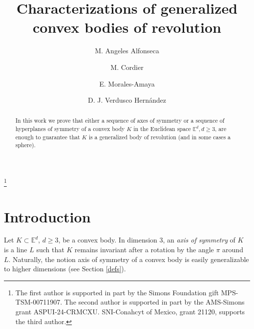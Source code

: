\documentclass[12pt,thmsa]{amsart}
\title[Generalized bodies of revolution]{Characterizations of generalized convex bodies of revolution}
\newcommand{\Ed}{\mathbb{E}^{d}}
\begin{document}
 \author[Alfonseca]{
M. Angeles Alfonseca}
\address{North Dakota State University, USA}  

\author[Cordier]{M. Cordier}    
\address{Chatham University, USA}

\author[Morales]{E. Morales-Amaya}
\address{Facultad de Matem\'aticas-Acapulco\\
Universidad Aut\'onoma de Guerrero, Mexico}

\author[Verdusco]{D. J. Verdusco Hern\'andez}
\address{Facultad de Matem\'aticas-Acapulco\\
Universidad Aut\'onoma de Guerrero, Mexico}

 \thanks{The first author is supported in part by the Simons Foundation gift MPS-TSM-00711907. The second author is supported in part by the AMS-Simons grant ASPUI-24-CRMCXU. SNI-Conahcyt of Mexico, grant 21120, supports the third author.}


 






\begin{abstract}
In this work we prove that either a sequence of axes of symmetry or a sequence of hyperplanes of symmetry of a convex body $K$ in the Euclidean space $\Ed, d\geq 3$, are enough to guarantee that $K$ is a generalized body of revolution (and in some cases a sphere).
\end{abstract}




\maketitle



\section{Introduction}


Let $K\subset \Ed$, $d\geq 3$, be a convex body. In dimension 3, an \textit{axis of symmetry} of $K$ is a line $L$ such that $K$ remains invariant after a rotation by the angle $\pi$ around $L$. Naturally, the notion axis of symmetry of a convex body is easily generalizable to higher dimensions (see Section \ref{defs}).
\end{document}
